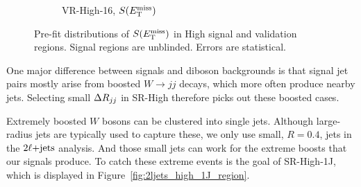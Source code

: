 \begin{figure}[tp]
\begin{subfigure}{0.48\textwidth}
\caption{VR-High-16, $\metsig$}
\end{subfigure}
\caption[
Pre-fit distributions of $\metsig$ in High signal and validation regions
]{%
Pre-fit distributions of $\metsig$ in High signal and validation regions.
Signal regions are unblinded.
Errors are statistical.
}
\label{fig:2ljets_high_region}
\end{figure}

One major difference between signals and diboson backgrounds is that signal
jet pairs mostly arise from boosted $W\rightarrow jj$ decays, which more often
produce nearby jets.
Selecting small $\Delta R_{jj}$ in SR-High therefore picks out these boosted cases.

Extremely boosted $W$ bosons can be clustered into single jets.
Although large-radius jets are typically used to capture these, we only use
small, $R=0.4$, jets in the $2\ell\mathrm{+jets}$ analysis.
And those small jets can work for the extreme boosts that our signals produce.
To catch these extreme events is the goal of SR-High-1J, which is displayed
in Figure~\ref{fig:2ljets_high_1J_region}.

